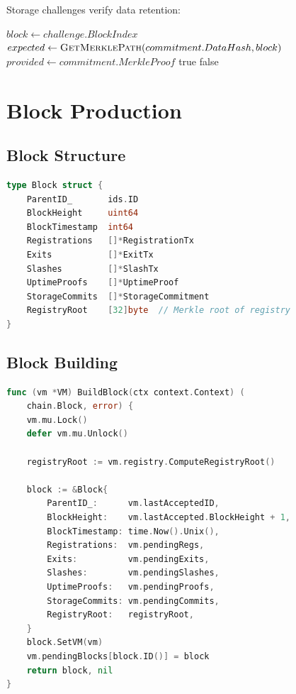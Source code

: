 \documentclass[11pt,a4paper]{article}
\begin{document}
Storage challenges verify data retention:

\begin{algorithm}
\caption{Storage Verification}
\begin{algorithmic}[1]
    \State $block \gets challenge.BlockIndex$
    \State $expected \gets \Call{GetMerklePath}{commitment.DataHash, block}$
    \State $provided \gets commitment.MerkleProof$
        \State \Return true
    \EndIf
    \State \Return false
\EndProcedure
\end{algorithmic}
\end{algorithm}

\section{Block Production}

\subsection{Block Structure}

\begin{lstlisting}[language=Go,caption={ServiceNode Block}]
type Block struct {
    ParentID_       ids.ID
    BlockHeight     uint64
    BlockTimestamp  int64
    Registrations   []*RegistrationTx
    Exits           []*ExitTx
    Slashes         []*SlashTx
    UptimeProofs    []*UptimeProof
    StorageCommits  []*StorageCommitment
    RegistryRoot    [32]byte  // Merkle root of registry
}
\end{lstlisting}

\subsection{Block Building}

\begin{lstlisting}[language=Go,caption={Block Building}]
func (vm *VM) BuildBlock(ctx context.Context) (
    chain.Block, error) {
    vm.mu.Lock()
    defer vm.mu.Unlock()

    registryRoot := vm.registry.ComputeRegistryRoot()

    block := &Block{
        ParentID_:      vm.lastAcceptedID,
        BlockHeight:    vm.lastAccepted.BlockHeight + 1,
        BlockTimestamp: time.Now().Unix(),
        Registrations:  vm.pendingRegs,
        Exits:          vm.pendingExits,
        Slashes:        vm.pendingSlashes,
        UptimeProofs:   vm.pendingProofs,
        StorageCommits: vm.pendingCommits,
        RegistryRoot:   registryRoot,
    }
    block.SetVM(vm)
    vm.pendingBlocks[block.ID()] = block
    return block, nil
}
\end{lstlisting}
\end{document}

